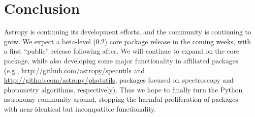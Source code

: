 \section{Conclusion}
Astropy is continuing its development efforts, and the community is continuing to grow.  We expect a beta-level (0.2) core package release in the coming weeks, with a first ``public'' release following after.  We will continue to expand on the core package, while also developing some major functionality in affiliated packages (e.g., \url{http://github.com/astropy/specutils} and \url{http://github.com/astropy/photutils}, packages focused on spectroscopy and photometry algorithms, respectively). Thus we hope to finally turn the Python astronomy community around, stopping the harmful proliferation of packages with near-identical but incompatible functionality.
